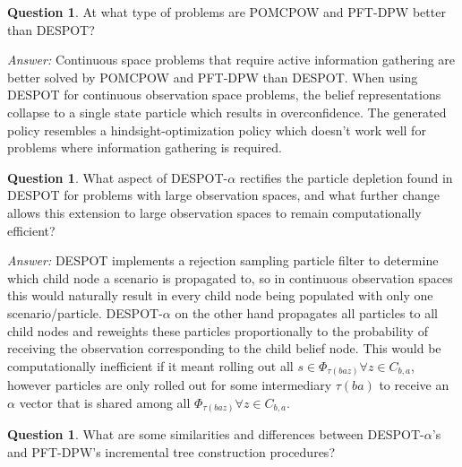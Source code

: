 \documentclass{article}
\theoremstyle{definition}
\newtheorem{question}[thm]{Question}
\newenvironment{answer}{\noindent\textit{Answer:}}{}
\begin{document}
\begin{question}
At what type of problems are POMCPOW and PFT-DPW better than DESPOT?  
\end{question}

\begin{answer}
Continuous space problems that require active information gathering are better solved by POMCPOW and PFT-DPW than DESPOT. When using DESPOT for continuous observation space problems, the belief representations collapse to a single state particle which results in overconfidence. The generated policy resembles a hindsight-optimization policy which doesn't work well for problems where information gathering is required.
\end{answer}

\begin{question}
What aspect of DESPOT-$\alpha$ rectifies the particle depletion found in DESPOT for problems with large observation spaces, and what further change allows this extension to large observation spaces to remain computationally efficient?
\end{question}

\begin{answer}
DESPOT implements a rejection sampling particle filter to determine which child node a scenario is propagated to, so in continuous observation spaces this would naturally result in every child node being populated with only one scenario/particle. DESPOT-$\alpha$ on the other hand propagates all particles to all child nodes and reweights these particles proportionally to the probability of receiving the observation corresponding to the child belief node. This would be computationally inefficient if it meant rolling out all $s\in\Phi_{\tau(baz)} \forall z\in C_{b,a}$, however particles are only rolled out for some intermediary $\tau(ba)$ to receive an $\alpha$ vector that is shared among all $\Phi_{\tau(baz)} \forall z\in C_{b,a}$.
\end{answer}

\begin{question}
What are some similarities and differences between DESPOT-$\alpha$'s and PFT-DPW's incremental tree construction procedures?
\end{question}
\end{document}
